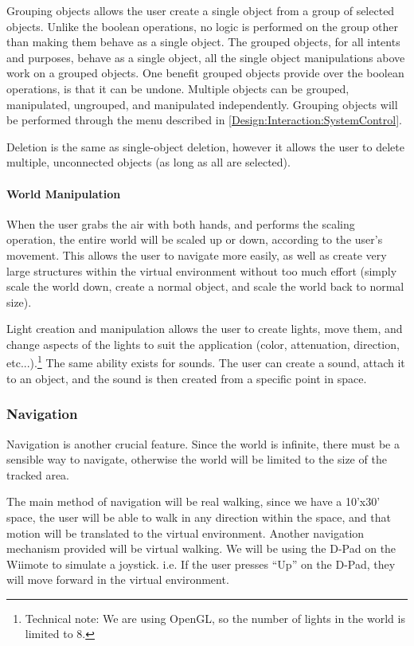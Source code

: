 Grouping objects allows the user create a single object from a group of selected objects.
Unlike the boolean operations, no logic is performed on the group other than making them behave as a single object.
The grouped objects, for all intents and purposes, behave as a single object, all the single object manipulations above work on a grouped objects.
One benefit grouped objects provide over the boolean operations, is that it can be undone.
Multiple objects can be grouped, manipulated, ungrouped, and manipulated independently.
Grouping objects will be performed through the menu described in \ref{Design:Interaction:SystemControl}.

Deletion is the same as single-object deletion, however it allows the user to delete multiple, unconnected objects (as long as all are selected).

\paragraph{World Manipulation}
When the user grabs the air with both hands, and performs the scaling operation, the entire world will be scaled up or down, according to the user's movement.
This allows the user to navigate more easily, as well as create very large structures within the virtual environment without too much effort (simply scale the world down, create a normal object, and scale the world back to normal size).

Light creation and manipulation allows the user to create lights, move them, and change aspects of the lights to suit the application (color, attenuation, direction, etc...).\footnote{Technical note: We are using OpenGL, so the number of lights in the world is limited to 8.}
The same ability exists for sounds.
The user can create a sound, attach it to an object, and the sound is then created from a specific point in space.

\subsubsection{Navigation}
\label{Design:Interaction:Navigation}
Navigation is another crucial feature.
Since the world is infinite, there must be a sensible way to navigate, otherwise the world will be limited to the size of the tracked area.

The main method of navigation will be real walking, since we have a 10'x30' space, the user will be able to walk in any direction within the space, and that motion will be translated to the virtual environment.
Another navigation mechanism provided will be virtual walking.
We will be using the D-Pad on the Wiimote to simulate a joystick.
i.e. If the user presses ``Up'' on the D-Pad, they will move forward in the virtual environment.

